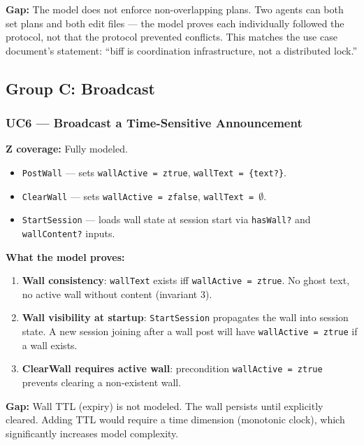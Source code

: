 \documentclass[a4paper,10pt,fleqn]{article}
\begin{document}
\textbf{Gap:} The model does not enforce non-overlapping plans. Two
agents can both set plans and both edit files --- the model proves each
individually followed the protocol, not that the protocol prevented
conflicts. This matches the use case document's statement: ``biff is
coordination infrastructure, not a distributed lock.''

\subsection{Group C: Broadcast}

\subsubsection{UC6 --- Broadcast a Time-Sensitive Announcement}

\textbf{Z coverage:} Fully modeled.

\begin{itemize}
  \item \texttt{PostWall} --- sets \texttt{wallActive = ztrue},
    \texttt{wallText = \{text?\}}.
  \item \texttt{ClearWall} --- sets \texttt{wallActive = zfalse},
    \texttt{wallText = $\emptyset$}.
  \item \texttt{StartSession} --- loads wall state at session start
    via \texttt{hasWall?} and \texttt{wallContent?} inputs.
\end{itemize}

\textbf{What the model proves:}

\begin{enumerate}
  \item \textbf{Wall consistency}: \texttt{wallText} exists iff
    \texttt{wallActive = ztrue}. No ghost text, no active wall without
    content (invariant 3).
  \item \textbf{Wall visibility at startup}: \texttt{StartSession}
    propagates the wall into session state. A new session joining after
    a wall post will have \texttt{wallActive = ztrue} if a wall exists.
  \item \textbf{ClearWall requires active wall}: precondition
    \texttt{wallActive = ztrue} prevents clearing a non-existent wall.
\end{enumerate}

\textbf{Gap:} Wall TTL (expiry) is not modeled. The wall persists until
explicitly cleared. Adding TTL would require a time dimension
(monotonic clock), which significantly increases model complexity.
\end{document}
